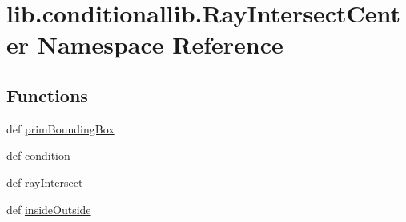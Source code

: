 \hypertarget{namespacelib_1_1conditionallib_1_1_ray_intersect_center}{\section{lib.\-conditionallib.\-Ray\-Intersect\-Center Namespace Reference}
\label{namespacelib_1_1conditionallib_1_1_ray_intersect_center}
}
\subsection*{Functions}
\begin{DoxyCompactItemize}
\item 
def \hyperlink{namespacelib_1_1conditionallib_1_1_ray_intersect_center_a0928a3d18cc56b5463236f7a590fc881}{prim\-Bounding\-Box}
\item 
def \hyperlink{namespacelib_1_1conditionallib_1_1_ray_intersect_center_a78300760455fb133a6dd8b8d5d3d18cb}{condition}
\item 
def \hyperlink{namespacelib_1_1conditionallib_1_1_ray_intersect_center_a331cd2cc392a790ff98b36ad95c3cd76}{ray\-Intersect}
\item 
def \hyperlink{namespacelib_1_1conditionallib_1_1_ray_intersect_center_a8edc917ab6cd0a786271caa5d2395de7}{inside\-Outside}
\end{DoxyCompactItemize}


